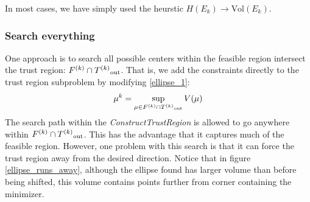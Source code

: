 In most cases, we have simply used the heurstic $H(E_k) \to \text{Vol}(E_k)$.

\subsubsection{Search everything}

One approach is to search all possible centers within the feasible region intersect the trust region:
$ {F}^{(k)} \cap {T^{(k)}}_{\text{out}}$.
That is, we add the constraints directly to the trust region subproblem by modifying \ref{ellipse_1}:
$$\mu^k = \sup_{\mu \in {F}^{(k)} \cap {T^{(k)}}_{\text{out}}} V(\mu)$$
The search path within the \emph{ConstructTrustRegion} is allowed to go anywhere within $ {F}^{(k)} \cap {T^{(k)}}_{\text{out}}$.
This has the advantage that it captures much of the feasible region.
However, one problem with this search is that it can force the trust region away from the desired direction.
Notice that in figure \ref{ellipse_runs_away}, although the ellipse found has larger volume than before being shifted, this volume contains points further from corner containing the minimizer.

